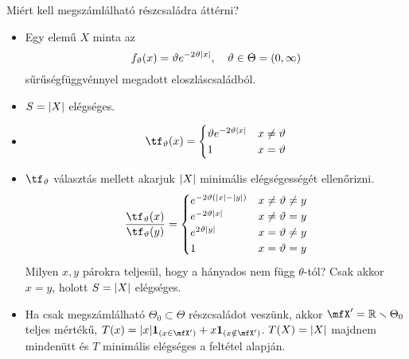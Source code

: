 \documentclass[aspectratio=169,notheorems,9pt,\option]{beamer}
\begin{document}
\begin{frame}{Miért kell megszámlálható részcsaládra áttérni?}
  \begin{itemize}
    \item Egy elemű $X$ minta  az 
    \begin{displaymath}
      f_\theta(x) = \theta e^{-2\theta \abs*{x}} ,\quad\theta\in\Theta=(0,\infty)
    \end{displaymath}
    sűrűségfüggvénnyel megadott eloszláscsaládból.
    \item $S=\abs*{X}$ elégséges.
    \item 
    \begin{displaymath}
      \tf_\theta(x)=\begin{cases}
        \theta e^{-2\theta \abs*{x}}& x\neq \theta\\
        1& x=\theta
      \end{cases}  
    \end{displaymath}
    \item $\tf_\theta$ választás mellett akarjuk $\abs*{X}$ minimális elégségességét ellenőrizni.
    \begin{displaymath}
      \frac{\tf_\theta(x)}{\tf_\theta(y)}=\begin{cases}
        e^{-2\theta(\abs*{x}-\abs*{y})} & x\neq\theta\neq y\\
        e^{-2\theta\abs*{x}} & x\neq\theta=y\\
        e^{2\theta\abs*{y}} &x=\theta\neq y\\
        1 & x=\theta=y
      \end{cases}
    \end{displaymath}
    Milyen $x,y$ párokra teljesül, hogy a hányados nem függ $\theta$-tól?
    Csak akkor $x=y$, holott $S=\abs*{X}$ elégséges.
    \item Ha csak megszámlálható $\Theta_0\subset \Theta$ részcsaládot veszünk, akkor 
    $\mfX'=\real\setminus\Theta_0$ teljes mértékű,  $T(x)=\abs{x}\I{x\in \mfX'}+x\I{x\notin\mfX'}$.
    $T(X)=\abs{X}$ majdnem mindenütt és $T$ minimális elégséges a feltétel alapján.
  \end{itemize}
  
\end{frame}
\end{document}
